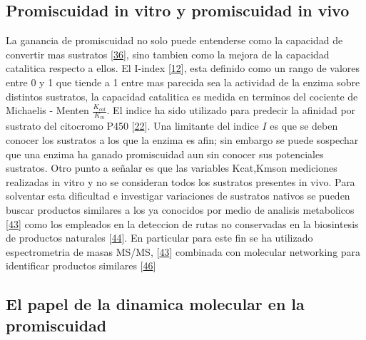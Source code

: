 \documentclass[12pt,twoside]{reedthesis}
\begin{document}
  \subsection{Promiscuidad in vitro y promiscuidad in
  vivo}\label{promiscuidad-in-vitro-y-promiscuidad-in-vivo}
  
  La ganancia de promiscuidad no solo puede entenderse como la capacidad
  de convertir mas sustratos
  {[}\protect\hyperlink{ref-carbonell_molecular_2010}{36}{]}, sino tambien
  como la mejora de la capacidad catalitica respecto a ellos. El I-index
  {[}\protect\hyperlink{ref-nath_quantitative_2008}{12}{]}, esta definido
  como un rango de valores entre 0 y 1 que tiende a 1 entre mas parecida
  sea la actividad de la enzima sobre distintos sustratos, la capacidad
  catalitica es medida en terminos del cociente de Michaelis - Menten
  \(\frac{K_{cat}}{K_m}\). El indice ha sido utilizado para predecir la
  afinidad por sustrato del citocromo P450
  {[}\protect\hyperlink{ref-nath_quantifying_2010}{22}{]}. Una limitante
  del indice \(I\) es que se deben conocer los sustratos a los que la
  enzima es afin; sin embargo se puede sospechar que una enzima ha ganado
  promiscuidad aun sin conocer sus potenciales sustratos. Otro punto a
  señalar es que las variables Kcat,Kmson mediciones realizadas in vitro y
  no se consideran todos los sustratos presentes in vivo. Para solventar
  esta dificultad e investigar variaciones de sustratos nativos se pueden
  buscar productos similares a los ya conocidos por medio de analisis
  metabolicos {[}\protect\hyperlink{ref-nesvizhskii_analysis_2007}{43}{]}
  como los empleados en la deteccion de rutas no conservadas en la
  biosintesis de productos naturales
  {[}\protect\hyperlink{ref-medema_computational_2015}{44}{]}. En
  particular para este fin se ha utilizado espectrometria de masas MS/MS,
  {[}\protect\hyperlink{ref-nesvizhskii_analysis_2007}{43}{]} combinada
  con molecular networking para identificar productos similares
  {[}\protect\hyperlink{ref-yang_molecular_2013}{46}{]}
  
  \subsection{El papel de la dinamica molecular en la
  promiscuidad}\label{el-papel-de-la-dinamica-molecular-en-la-promiscuidad}
  
\end{document}
